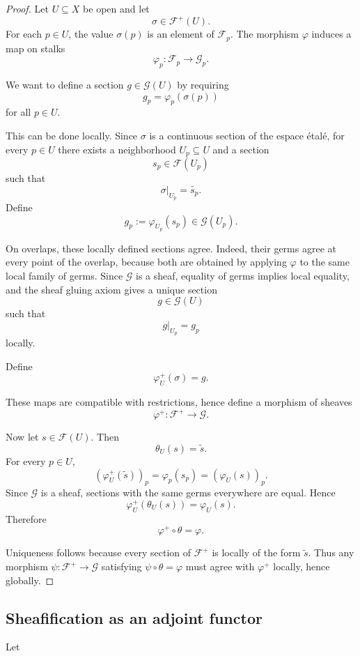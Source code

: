 \documentclass[12pt,a4paper]{article}
\begin{document}
\begin{proof}
	Let $U \subseteq X$ be open and let
	\[
	\sigma \in \mathcal F^+(U).
	\]
	For each $p \in U$, the value $\sigma(p)$ is an element of $\mathcal F_p$.
	The morphism $\varphi$ induces a map on stalks
	\[
	\varphi_p : \mathcal F_p \longrightarrow \mathcal G_p.
	\]
	
	We want to define a section $g \in \mathcal G(U)$ by requiring
	\[
	g_p=\varphi_p(\sigma(p))
	\]
	for all $p \in U$.
	
	This can be done locally.
	Since $\sigma$ is a continuous section of the espace \'{e}tal\'{e}, for every
	$p \in U$ there exists a neighborhood $U_p \subseteq U$ and a section
	\[
	s_p \in \mathcal F(U_p)
	\]
	such that
	\[
	\sigma|_{U_p}=\widetilde{s_p}.
	\]
	Define
	\[
	g_p := \varphi_{U_p}(s_p) \in \mathcal G(U_p).
	\]
	
	On overlaps, these locally defined sections agree.
	Indeed, their germs agree at every point of the overlap, because both are
	obtained by applying $\varphi$ to the same local family of germs.
	Since $\mathcal G$ is a sheaf, equality of germs implies local equality, and
	the sheaf gluing axiom gives a unique section
	\[
	g \in \mathcal G(U)
	\]
	such that
	\[
	g|_{U_p}=g_p
	\]
	locally.
	
	Define
	\[
	\varphi_U^+(\sigma)=g.
	\]
	
	These maps are compatible with restrictions, hence define a morphism of sheaves
	\[
	\varphi^+ : \mathcal F^+ \longrightarrow \mathcal G.
	\]
	
	Now let $s \in \mathcal F(U)$.
	Then
	\[
	\theta_U(s)=\widetilde{s}.
	\]
	For every $p \in U$,
	\[
	(\varphi_U^+(\widetilde{s}))_p
	=
	\varphi_p(s_p)
	=
	(\varphi_U(s))_p.
	\]
	Since $\mathcal G$ is a sheaf, sections with the same germs everywhere are
	equal. Hence
	\[
	\varphi_U^+(\theta_U(s))=\varphi_U(s).
	\]
	Therefore
	\[
	\varphi^+ \circ \theta=\varphi.
	\]
	
	Uniqueness follows because every section of $\mathcal F^+$ is locally of the
	form $\widetilde{s}$.
	Thus any morphism $\psi:\mathcal F^+ \to \mathcal G$ satisfying
	$\psi \circ \theta=\varphi$ must agree with $\varphi^+$ locally, hence globally.
\end{proof}

\subsection{Sheafification as an adjoint functor}

Let
\end{document}
